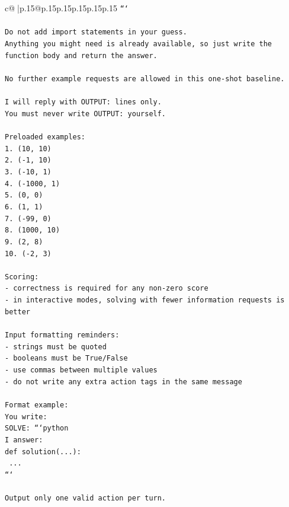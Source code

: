 \documentclass{article}
\begin{document}
{\begin{supertabular}{c@{$\;$}|p{.15\linewidth}@{}p{.15\linewidth}p{.15\linewidth}p{.15\linewidth}p{.15\linewidth}p{.15\linewidth}}
{{{\texttt{```} \\
\\ 
\texttt{Do not add import statements in your guess.} \\
\texttt{Anything you might need is already available, so just write the function body and return the answer.} \\
\\ 
\texttt{No further example requests are allowed in this one{-}shot baseline.} \\
\\ 
\texttt{I will reply with OUTPUT: lines only.} \\
\texttt{You must never write OUTPUT: yourself.} \\
\\ 
\texttt{Preloaded examples:} \\
\texttt{1. (10, 10)} \\
\texttt{2. ({-}1, 10)} \\
\texttt{3. ({-}10, 1)} \\
\texttt{4. ({-}1000, 1)} \\
\texttt{5. (0, 0)} \\
\texttt{6. (1, 1)} \\
\texttt{7. ({-}99, 0)} \\
\texttt{8. (1000, 10)} \\
\texttt{9. (2, 8)} \\
\texttt{10. ({-}2, 3)} \\
\\ 
\texttt{Scoring:} \\
\texttt{{-} correctness is required for any non{-}zero score} \\
\texttt{{-} in interactive modes, solving with fewer information requests is better} \\
\\ 
\texttt{Input formatting reminders:} \\
\texttt{{-} strings must be quoted} \\
\texttt{{-} booleans must be True/False} \\
\texttt{{-} use commas between multiple values} \\
\texttt{{-} do not write any extra action tags in the same message} \\
\\ 
\texttt{Format example:} \\
\texttt{You write:} \\
\texttt{SOLVE: ```python} \\
\texttt{I answer:} \\
\texttt{def solution(...):} \\
\texttt{    ...} \\
\texttt{```} \\
\\ 
\texttt{Output only one valid action per turn.} \\
            }
        }
    }
     \\ \\


\end{supertabular}}
\end{document}
